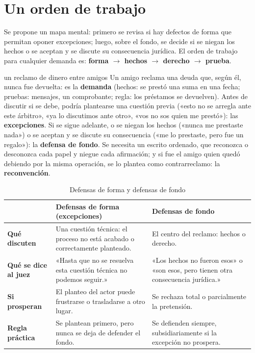 \documentclass[12pt,oneside]{book}
\begin{document}
\section{Un orden de trabajo}

Se propone un mapa mental: primero se revisa si hay defectos de forma que permitan oponer excepciones; luego, sobre el fondo, se decide si se niegan los hechos o se aceptan y se discute su consecuencia jurídica. El orden de trabajo para cualquier demanda es: \textbf{forma $\rightarrow$ hechos $\rightarrow$ derecho $\rightarrow$ prueba}.

\begin{ejemplo}{un reclamo de dinero entre amigos}
Un amigo reclama una deuda que, según él, nunca fue devuelta: es la \textbf{demanda} (hechos: se prestó una suma en una fecha; pruebas: mensajes, un comprobante; regla: los préstamos se devuelven). Antes de discutir si se debe, podría plantearse una cuestión previa («esto no se arregla ante este árbitro», «ya lo discutimos ante otro», «vos no sos quien me prestó»): las \textbf{excepciones}. Si se sigue adelante, o se niegan los hechos («nunca me prestaste nada») o se aceptan y se discute su consecuencia («me lo prestaste, pero fue un regalo»): la \textbf{defensa de fondo}. Se necesita un escrito ordenado, que reconozca o desconozca cada papel y niegue cada afirmación; y si fue el amigo quien quedó debiendo por la misma operación, se lo plantea como contrarreclamo: la \textbf{reconvención}.
\end{ejemplo}

\begin{table}[H]
\centering
\caption{Defensas de forma y defensas de fondo}
\begin{tabularx}{\textwidth}{>{\raggedright\arraybackslash\bfseries}p{} X X}
\toprule
 & Defensas de forma (excepciones) & Defensas de fondo \\
\midrule
Qué discuten & Una cuestión técnica: el proceso no está acabado o correctamente planteado. & El centro del reclamo: hechos o derecho. \\
Qué se dice al juez & «Hasta que no se resuelva esta cuestión técnica no podemos seguir.» & «Los hechos no fueron esos» o «son esos, pero tienen otra consecuencia jurídica.» \\
Si prosperan & El planteo del actor puede frustrarse o trasladarse a otro lugar. & Se rechaza total o parcialmente la pretensión. \\
Regla práctica & Se plantean primero, pero nunca se deja de defender el fondo. & Se defienden siempre, subsidiariamente si la excepción no prospera. \\
\bottomrule
\end{tabularx}
\end{table}
\end{document}
